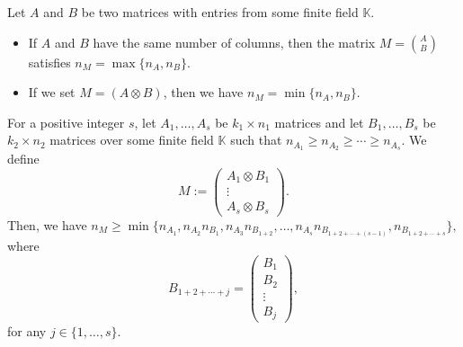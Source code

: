 \documentclass[10pt,a4paper]{amsart}
\newcommand{\K}{\mathbb{K}}
\begin{document}
\begin{lem}\label{bound lemma}
Let $A$ and $B$ be two matrices with entries from some finite field $\K$.
\begin{itemize}
\item[i.] If $A$ and $B$ have the same number of columns, then the matrix $M={A\choose B}$ satisfies $n_M=\max\{n_A,n_B\}$.
\item[ii.] If we set $M=(A\otimes B)$, then we have $n_M=\min\{n_A,n_B\}$.
\end{itemize}
\end{lem}

\begin{prop}\label{bound prop}
For a positive integer $s$, let $A_1,\ldots, A_s$ be $k_1 \times n_1$ matrices and let $B_1,\ldots, B_s$ be $k_2 \times n_2$ matrices over some finite field $\K$ such that $n_{A_1}\geq n_{A_2}\geq \cdots \geq n_{A_s}$. We define \[M:=\begin{pmatrix}
A_1 \otimes B_1\\
\vdots\\
A_s \otimes B_s
\end{pmatrix}.\]
Then, we have $n_M\geq \min\{n_{A_1},n_{A_2}n_{B_1}, n_{A_3}n_{B_{1+2}},\ldots, n_{A_s}n_{B_{1+2+\cdots +(s-1)}},n_{B_{1+2+\cdots +s}}\},$ where \[B_{1+2+\cdots +j}=\begin{pmatrix}
 B_1\\
 B_2\\
\vdots\\
 B_j
\end{pmatrix},\]
for any $j\in\{1,\ldots,s\}$.
\end{prop}
\end{document}
